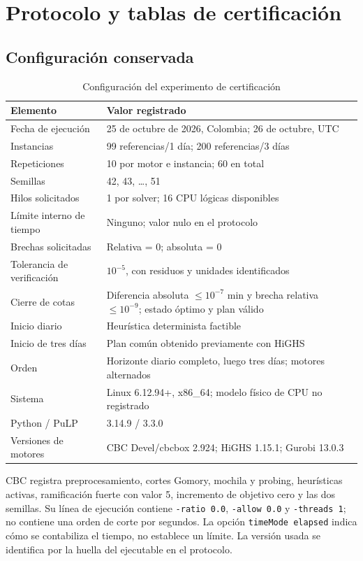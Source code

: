 \documentclass[12pt,a4paper,oneside]{article}
\begin{document}
\clearpage
\section{Protocolo y tablas de certificación}\label{an:certificaciones}
\subsection{Configuración conservada}
\begin{table}[H]\centering\small
\caption{Configuración del experimento de certificación}
\begin{tabular}{p{49mm}p{100mm}}\toprule
Elemento & Valor registrado\\\midrule
Fecha de ejecución & 25 de octubre de 2026, Colombia; 26 de octubre, UTC\\
Instancias & 99 referencias/1 día; 200 referencias/3 días\\
Repeticiones & 10 por motor e instancia; 60 en total\\
Semillas & 42, 43, \ldots, 51\\
Hilos solicitados & 1 por solver; 16 CPU lógicas disponibles\\
Límite interno de tiempo & Ninguno; valor nulo en el protocolo\\
Brechas solicitadas & Relativa = 0; absoluta = 0\\
Tolerancia de verificación & $10^{-5}$, con residuos y unidades identificados\\
Cierre de cotas & Diferencia absoluta $\leq10^{-7}$ min y brecha relativa $\leq10^{-9}$; estado óptimo y plan válido\\
Inicio diario & Heurística determinista factible\\
Inicio de tres días & Plan común obtenido previamente con HiGHS\\
Orden & Horizonte diario completo, luego tres días; motores alternados\\
Sistema & Linux 6.12.94+, x86\_64; modelo físico de CPU no registrado\\
Python / PuLP & 3.14.9 / 3.3.0\\
Versiones de motores & CBC Devel/cbcbox 2.924; HiGHS 1.15.1; Gurobi 13.0.3\\\bottomrule
\end{tabular}
\end{table}

CBC registra preprocesamiento, cortes Gomory, mochila y probing, heurísticas activas, ramificación fuerte con valor 5, incremento de objetivo cero y las dos semillas. Su línea de ejecución contiene \texttt{-ratio 0.0}, \texttt{-allow 0.0} y \texttt{-threads 1}; no contiene una orden de corte por segundos. La opción \texttt{timeMode elapsed} indica cómo se contabiliza el tiempo, no establece un límite. La versión usada se identifica por la huella del ejecutable en el protocolo.
\end{document}
